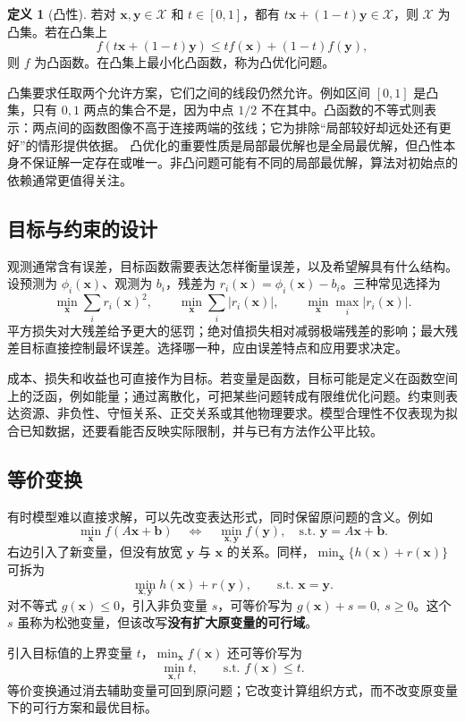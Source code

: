\documentclass[UTF8,fontset=fandol,a4paper,12pt]{ctexart}
\newcommand{\vx}{\boldsymbol x}
\newcommand{\vb}{\boldsymbol b}
\theoremstyle{definition}
\newtheorem{definition}{定义}[section]
\begin{document}
\begin{definition}[凸性]
若对 $\vx,\boldsymbol y\in\mathcal X$ 和 $t\in[0,1]$，都有 $t\vx+(1-t)\boldsymbol y\in\mathcal X$，则 $\mathcal X$ 为凸集。若在凸集上
\[
 f(t\vx+(1-t)\boldsymbol y)\le t f(\vx)+(1-t)f(\boldsymbol y),
\]
则 $f$ 为凸函数。在凸集上最小化凸函数，称为凸优化问题。
\end{definition}
凸集要求任取两个允许方案，它们之间的线段仍然允许。例如区间 $[0,1]$ 是凸集，只有 $0,1$ 两点的集合不是，因为中点 $1/2$ 不在其中。凸函数的不等式则表示：两点间的函数图像不高于连接两端的弦线；它为排除“局部较好却远处还有更好”的情形提供依据。
凸优化的重要性质是局部最优解也是全局最优解，但凸性本身不保证解一定存在或唯一。非凸问题可能有不同的局部最优解，算法对初始点的依赖通常更值得关注。

\subsection{目标与约束的设计}
观测通常含有误差，目标函数需要表达怎样衡量误差，以及希望解具有什么结构。设预测为 $\phi_i(\vx)$、观测为 $b_i$，残差为 $r_i(\vx)=\phi_i(\vx)-b_i$。三种常见选择为
\[
 \min_{\vx}\sum_i r_i(\vx)^2,\qquad
 \min_{\vx}\sum_i|r_i(\vx)|,\qquad
 \min_{\vx}\max_i|r_i(\vx)|.
\]
平方损失对大残差给予更大的惩罚；绝对值损失相对减弱极端残差的影响；最大残差目标直接控制最坏误差。选择哪一种，应由误差特点和应用要求决定。

成本、损失和收益也可直接作为目标。若变量是函数，目标可能是定义在函数空间上的泛函，例如能量；通过离散化，可把某些问题转成有限维优化问题。约束则表达资源、非负性、守恒关系、正交关系或其他物理要求。模型合理性不仅表现为拟合已知数据，还要看能否反映实际限制，并与已有方法作公平比较。

\subsection{等价变换}
有时模型难以直接求解，可以先改变表达形式，同时保留原问题的含义。例如
\[
 \min_{\vx} f(A\vx+\vb)
 \quad\Longleftrightarrow\quad
 \min_{\vx,\boldsymbol y} f(\boldsymbol y),\quad
 \text{s.t. }\boldsymbol y=A\vx+\vb.
\]
右边引入了新变量，但没有放宽 $\boldsymbol y$ 与 $\vx$ 的关系。同样，$\min_{\vx}\{h(\vx)+r(\vx)\}$ 可拆为
\[
 \min_{\vx,\boldsymbol y}h(\vx)+r(\boldsymbol y),
 \qquad\text{s.t. }\vx=\boldsymbol y.
\]
对不等式 $g(\vx)\le0$，引入非负变量 $s$，可等价写为 $g(\vx)+s=0,\ s\ge0$。这个 $s$ 虽称为松弛变量，但该改写\textbf{没有扩大原变量的可行域}。

引入目标值的上界变量 $t$，$\min_{\vx} f(\vx)$ 还可等价写为
\[
 \min_{\vx,t}t,\qquad\text{s.t. }f(\vx)\le t.
\]
等价变换通过消去辅助变量可回到原问题；它改变计算组织方式，而不改变原变量下的可行方案和最优目标。
\end{document}
